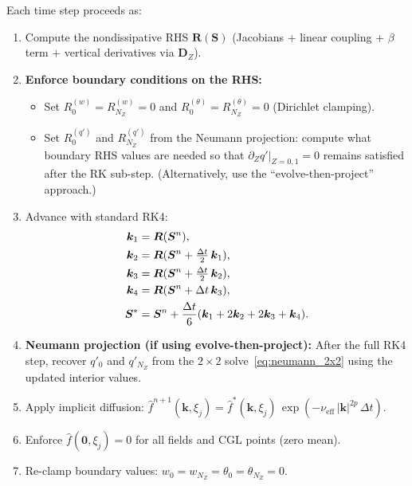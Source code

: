 \documentclass[11pt]{article}
\newcommand{\kh}{|\bm{k}|}
\newcommand{\hhat}[1]{\widehat{#1}}
\newcommand{\Dvec}{\bm{D}}
\begin{document}
Each time step proceeds as:
\begin{enumerate}[nosep]
\item Compute the nondissipative RHS $\bm{R}(\bm{S})$ (Jacobians + linear coupling + $\beta$ term + vertical derivatives via $\Dvec_Z$).
\item \textbf{Enforce boundary conditions on the RHS:}
\begin{itemize}[nosep]
\item Set $R^{(w)}_0 = R^{(w)}_{N_Z} = 0$ and $R^{(\theta)}_0 = R^{(\theta)}_{N_Z} = 0$ (Dirichlet clamping).
\item Set $R^{(q')}_0$ and $R^{(q')}_{N_Z}$ from the Neumann projection: compute what boundary RHS values are needed so that $\partial_Z q'|_{Z=0,1} = 0$ remains satisfied after the RK sub-step. (Alternatively, use the ``evolve-then-project'' approach.)
\end{itemize}
\item Advance with standard RK4:
\begin{align}
\bm{k}_1 &= \bm{R}(\bm{S}^n), \notag\\
\bm{k}_2 &= \bm{R}(\bm{S}^n + \tfrac{\Delta t}{2}\,\bm{k}_1), \notag\\
\bm{k}_3 &= \bm{R}(\bm{S}^n + \tfrac{\Delta t}{2}\,\bm{k}_2), \notag\\
\bm{k}_4 &= \bm{R}(\bm{S}^n + \Delta t\,\bm{k}_3), \notag\\
\bm{S}^* &= \bm{S}^n + \frac{\Delta t}{6}(\bm{k}_1 + 2\bm{k}_2 + 2\bm{k}_3 + \bm{k}_4). \notag
\end{align}
\item \textbf{Neumann projection (if using evolve-then-project):} After the full RK4 step, recover $q'_0$ and $q'_{N_Z}$ from the $2\times 2$ solve~\eqref{eq:neumann_2x2} using the updated interior values.
\item Apply implicit diffusion: $\hhat{f}^{n+1}(\bm{k}, \xi_j) = \hhat{f}^*(\bm{k}, \xi_j)\,\exp(-\nu_{\mathrm{eff}}\,\kh^{2p}\,\Delta t)$.
\item Enforce $\hhat{f}(\bm{0}, \xi_j) = 0$ for all fields and CGL points (zero mean).
\item Re-clamp boundary values: $w_0 = w_{N_Z} = \theta_0 = \theta_{N_Z} = 0$.
\end{enumerate}

\end{document}
